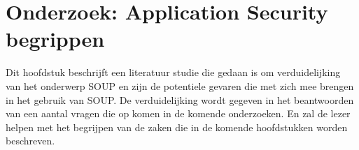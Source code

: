 
\chapter{Onderzoek: Application Security begrippen}\label{ch:onderzoek:-application-security-begrippen}
Dit hoofdstuk beschrijft een literatuur studie die gedaan is om verduidelijking van het onderwerp SOUP en zijn de potentiele gevaren die met zich mee brengen in het gebruik van SOUP. De verduidelijking wordt gegeven in het beantwoorden van een aantal vragen die op komen in de komende onderzoeken.
En zal de lezer helpen met het begrijpen van de zaken die in de komende hoofdstukken worden beschreven.
